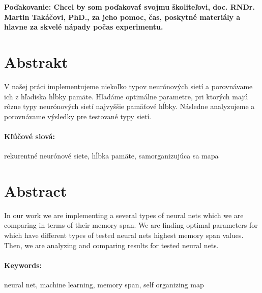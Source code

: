 \documentclass[12pt, oneside]{book}
\begin{document}
 \vfill
 {\bf Poďakovanie: Chcel by som poďakovať svojmu školiteľovi, doc. RNDr. Martin Takáčovi, PhD., za jeho 
 pomoc, čas, poskytné materiály a hlavne za skvelé nápady počas experimentu.}



\newpage 
\section*{Abstrakt}

V našej práci implementujeme niekoľko typov neurónových sietí a porovnávame ich z hľadiska hĺbky pamäte.
Hľadáme optimálne parametre, pri ktorých majú rôzne typy neurónových sietí najvyššie pamäťové hĺbky.
Následne analyzujeme a porovnávame výsledky pre testované typy sietí.

\paragraph*{Kľúčové slová:} rekurentné neurónové siete, hĺbka pamäte, samorganizujúca sa mapa


\newpage 
\section*{Abstract}

In our work we are implementing a several types of neural nets which we are comparing in terms of their memory span.
We are finding optimal parameters for which have different types of tested neural nets highest memory span values.
Then, we are analyzing and comparing results for tested neural nets.

\paragraph*{Keywords:} neural net, machine learning, memory span, self organizing map


%
%
\end{document}
